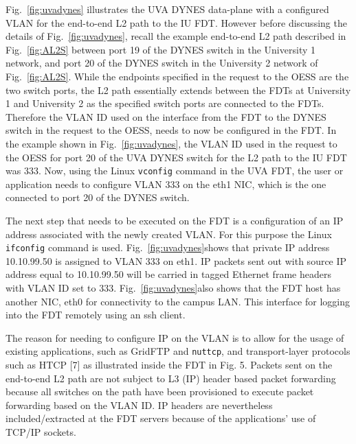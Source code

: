 {Fig.~\ref{fig:uvadynes} illustrates the UVA DYNES data-plane with a configured VLAN for the end-to-end L2 path to the IU FDT.
However before discussing the details of Fig.~\ref{fig:uvadynes}, recall the example end-to-end L2 path described in Fig.~\ref{fig:AL2S} between
port 19 of the DYNES switch in the University 1 network,
and port 20 of the DYNES switch in the University 2 network of Fig.~\ref{fig:AL2S}. While the endpoints specified in the request
to the OESS are the two switch ports, the L2 path essentially
extends between the FDTs at University 1 and University 2
as the specified switch ports are connected to the FDTs.
Therefore the VLAN ID used on the interface from the FDT
to the DYNES switch in the request to the OESS, needs to
now be configured in the FDT. In the example shown in
Fig.~\ref{fig:uvadynes}, the VLAN ID used in the request to the OESS for
port 20 of the UVA DYNES switch for the L2 path to the
IU FDT was 333. Now, using the Linux \texttt{vconfig} command
in the UVA FDT, the user or application needs to configure
VLAN 333 on the eth1 NIC, which is the one connected to
port 20 of the DYNES switch.

The next step that needs to be executed on the FDT is a
configuration of an IP address associated with the newly created VLAN. For this purpose the Linux \texttt{ifconfig} command
is used. Fig.~\ref{fig:uvadynes}shows that private IP address 10.10.99.50
is assigned to VLAN 333 on eth1. IP packets sent out
with source IP address equal to 10.10.99.50 will be carried
in tagged Ethernet frame headers with VLAN ID set to 333.
Fig.~\ref{fig:uvadynes}also shows that the FDT host has another NIC, eth0
for connectivity to the campus LAN. This interface for logging into the FDT remotely using an ssh client.

The reason for needing to configure IP on the VLAN is to allow for the usage of existing applications, such as GridFTP
and \texttt{nuttcp}, and transport-layer protocols such as HTCP [7]
as illustrated inside the FDT in Fig. 5. Packets sent on the
end-to-end L2 path are not subject to L3 (IP) header based
packet forwarding because all switches on the path have
been provisioned to execute packet forwarding based on the
VLAN ID. IP headers are nevertheless included/extracted at
the FDT servers because of the applications' use of TCP/IP
sockets.

}
